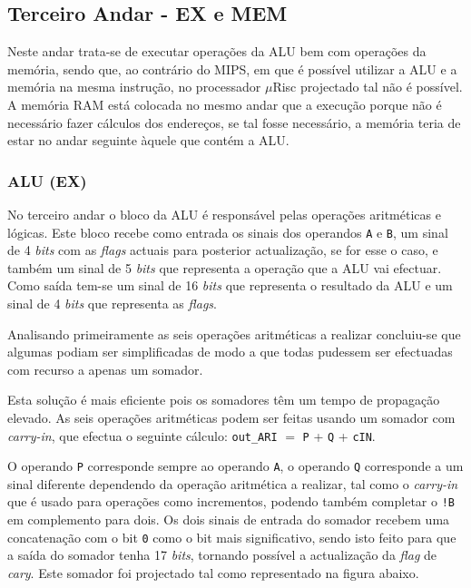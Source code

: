 \documentclass[11pt]{article}
\numberwithin{equation}{section}
\begin{document}
\subsection{Terceiro Andar - EX e MEM}

Neste andar trata-se de executar operações da ALU bem com operações da memória, sendo que, ao contrário do MIPS, em que é possível utilizar a ALU e a memória na mesma instrução, no processador $\mu$Risc projectado tal não é possível. A memória RAM está colocada no mesmo andar que a execução porque não é necessário fazer cálculos dos endereços, se tal fosse necessário, a memória teria de estar no andar seguinte àquele que contém a ALU. 

\subsubsection{ALU (EX)}

No terceiro andar o bloco da ALU é responsável pelas operações aritméticas e lógicas. Este bloco recebe como entrada os sinais dos operandos \texttt{A} e \texttt{B}, um sinal de 4 \textit{bits} com as \textit{flags} actuais para posterior actualização, se for esse o caso, e também um sinal de 5 \textit{bits} que representa a operação que a ALU vai efectuar. Como saída tem-se um sinal de 16 \textit{bits} que representa o resultado da ALU e um sinal de 4 \textit{bits} que representa as \textit{flags}.

Analisando primeiramente as seis operações aritméticas a realizar concluiu-se que algumas podiam ser simplificadas de modo a que todas pudessem ser efectuadas com recurso a apenas um somador. 


Esta solução é mais eficiente pois os somadores têm um tempo de propagação elevado. As seis operações aritméticas podem ser feitas usando um somador com \textit{carry-in}, que efectua o seguinte cálculo: \texttt{out\_ARI} $=$ \texttt{P} + \texttt{Q} + \texttt{cIN}. 

O operando \texttt{P} corresponde sempre ao operando \texttt{A}, o operando \texttt{Q} corresponde a  um sinal diferente dependendo da operação aritmética a realizar, tal como o \textit{carry-in} que é usado para operações como incrementos, podendo também completar o \texttt{!B} em complemento para dois. Os dois sinais de entrada do somador recebem uma concatenação com o bit \texttt{0} como o bit mais significativo, sendo isto feito para que a saída do somador tenha 17 \textit{bits}, tornando possível a actualização da \textit{flag} de \textit{cary}. Este somador foi projectado tal como representado na figura abaixo.
\end{document}
